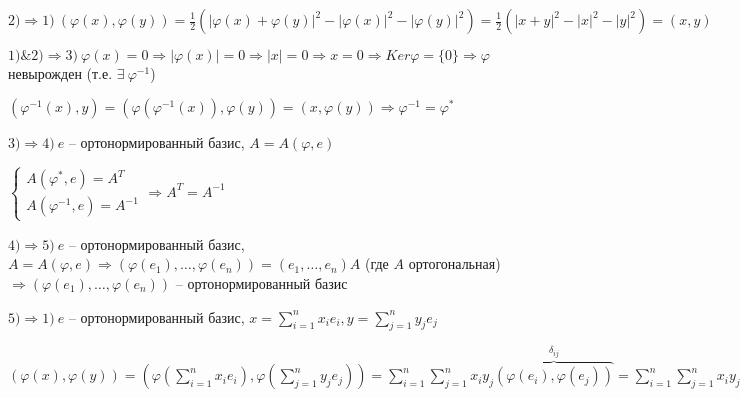 \vspace{\baselineskip}
$2) \Rightarrow 1) \ (\varphi(x), \varphi(y)) = \frac{1}{2} (|\varphi(x) + \varphi(y)|^2 - |\varphi(x)|^2 - |\varphi(y)|^2) = \frac{1}{2} (|x+y|^2 - |x|^2 - |y|^2) = (x, y)$

\vspace{\baselineskip}
$1) \& 2) \Rightarrow 3) \ \varphi(x) = 0 \Rightarrow |\varphi(x)| = 0 \Rightarrow |x| = 0 \Rightarrow x = 0 \Rightarrow Ker \varphi = \{0\} \Rightarrow \varphi$ невырожден (т.е. $\exists \ \varphi^{-1}$)

$(\varphi^{-1}(x), y) = (\varphi(\varphi^{-1}(x)), \varphi(y)) = (x, \varphi(y)) \Rightarrow \varphi^{-1} = \varphi^*$

\vspace{\baselineskip}
$3) \Rightarrow 4) \ e$ -- ортонормированный базис, $A = A(\varphi, e)$

$\begin{cases} A(\varphi^*, e) = A^T \\ A(\varphi^{-1}, e) = A^{-1} \end{cases} \Rightarrow A^T = A^{-1}$

\vspace{\baselineskip}
$4) \Rightarrow 5) \ e$ -- ортонормированный базис, $A = A(\varphi, e) \Rightarrow (\varphi(e_1), \dots, \varphi(e_n)) = (e_1, \dots, e_n) A$ (где $A$ ортогональная) $\Rightarrow (\varphi(e_1), \dots, \varphi(e_n))$ -- ортонормированный базис

\vspace{\baselineskip}
$5) \Rightarrow 1) \ e$ -- ортонормированный базис, $x = \sum\limits_{i=1}^n x_i e_i, y = \sum\limits_{j=1}^n y_j e_j$

$(\varphi(x), \varphi(y)) = (\varphi(\sum\limits_{i=1}^n x_i e_i), \varphi(\sum\limits_{j=1}^n y_j e_j)) = \sum\limits_{i=1}^n\sum\limits_{j=1}^n x_i y_j \overbrace{(\varphi(e_i), \varphi(e_j))}^{\delta_{ij}} = \sum\limits_{i=1}^n\sum\limits_{j=1}^n x_i y_j (e_i, e_j) = (\sum\limits_{i=1}^n x_i e_i, \sum\limits_{j=1}^n y_i e_j) = (x, y) \ \lhd$

